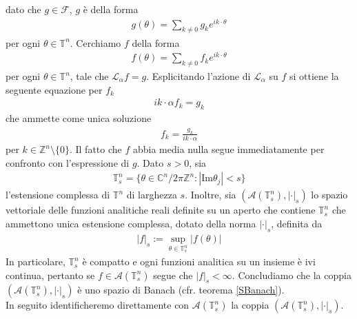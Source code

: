 \documentclass[twoside, 11pt]{amsbook}
\makeatletter
\newcommand{\0}{{(0)}}
\newcommand{\3}{{(3)}}
\theoremstyle{colonplain}
\theoremstyle{colondefinition}
\theoremstyle{colonremark}
\numberwithin{equation}{chapter}
\renewcommand{\proofname}{Dimostrazione}
\renewenvironment{proof}[1][\proofname]{\par
  \pushQED{\qed}%
  \normalfont \topsep6\p@\@plus6\p@\relax
  \trivlist
  \item[\hskip\labelsep\bfseries #1:]\ignorespaces
}{%
  \popQED\endtrivlist\@endpefalse
}
\makeatother
\begin{document}
\begin{proof} dato che $g \in \mathscr{F}$, $g$ è della forma
\begin{align}
    g(\theta) = \sum_{k \neq 0} g_ke^{i k \cdot \theta}
\end{align}
per ogni $\theta \in \mathbb{T}^n$. Cerchiamo $f$ della forma
\begin{align}
    f(\theta) = \sum_{k \neq 0} f_ke^{i k \cdot \theta}
\end{align}
per ogni $\theta \in \mathbb{T}^n$, tale che $\mathcal{L}_\alpha f = g$. Esplicitando l'azione di $\mathcal{L}_\alpha$ su $f$ si ottiene la seguente equazione per $f_k$
\begin{align}
    i k \cdot \alpha f_k = g_k 
\end{align}
che ammette come unica soluzione
\begin{align}\label{UniqueSol}
    f_k = \frac{g_k}{i k \cdot \alpha}
\end{align}
per $k \in \mathbb{Z}^n \setminus \{0\}$. Il fatto che $f$ abbia media nulla segue immediatamente per confronto con l'espressione di $g$.
\end{proof}
Dato $s > 0$, sia
\begin{align}
    \mathbb{T}^n_s = \{\theta \in \mathbb{C}^n/2\pi\mathbb{Z}^n : |\mathrm{Im}\theta_j| < s\}
\end{align}
l'estensione complessa di $\mathbb{T}^n$ di larghezza $s$. Inoltre, sia $(\mathcal{A}(\mathbb{T}^n_s), |\cdot|_s)$ lo spazio vettoriale delle funzioni analitiche reali definite su un aperto che contiene $\mathbb{T}^n_s$ che ammettono unica estensione complessa, dotato della norma $|\cdot|_s$, definita da
\begin{align}
    |f|_s := \sup_{\theta \in \mathbb{T}^n_s} |f(\theta)|
\end{align}
In particolare, $\mathbb{T}^n_s$ è compatto e ogni funzioni analitica su un insieme è ivi continua, pertanto se $f \in \mathcal{A}(\mathbb{T}^n_s)$ segue che $|f|_s < \infty$. Concludiamo che la coppia $(\mathcal{A}(\mathbb{T}^n_s), |\cdot|_s)$ è uno spazio di Banach (cfr. teorema \ref{SBanach}). \\
In seguito identificheremo direttamente con $\mathcal{A}(\mathbb{T}^n_s)$ la coppia $(\mathcal{A}(\mathbb{T}^n_s), |\cdot|_s)$.
\end{document}
